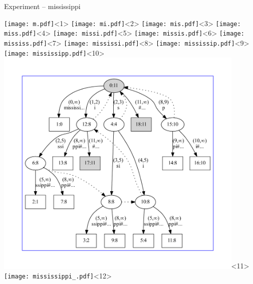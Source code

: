\begin{frame}{Experiment -- mississippi}

\begin{overlayarea}{\textwidth}{\textheight}
\texttt{[image: m.pdf]}<1>
\texttt{[image: mi.pdf]}<2>
\texttt{[image: mis.pdf]}<3>
\texttt{[image: miss.pdf]}<4>
\texttt{[image: missi.pdf]}<5>
\texttt{[image: missis.pdf]}<6>
\texttt{[image: mississ.pdf]}<7>
\texttt{[image: mississi.pdf]}<8>
\texttt{[image: mississip.pdf]}<9>
\texttt{[image: mississipp.pdf]}<10>
\includegraphics[keepaspectratio,height=0.9\textheight,width=0.9\textwidth]{mississippi.pdf}<11>
\texttt{[image: mississippi\_.pdf]}<12>
\end{overlayarea}
\end{frame}
